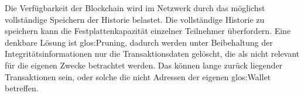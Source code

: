 Die Verfügbarkeit der Blockchain wird im Netzwerk durch das möglichst vollständige Speichern der Historie belastet.
Die vollständige Historie zu speichern kann die Festplattenkapazität einzelner Teilnehmer überfordern.
Eine denkbare Lösung ist \gls{glos:Pruning}, dadurch werden unter Beibehaltung der Integritätsinformationen nur die Transaktionsdaten gelöscht, die als nicht relevant für die eigenen Zwecke betrachtet werden. Das können \zB{} lange zurück liegender Transaktionen sein, oder solche die nicht Adressen der eigenen \gls{glos:Wallet} betreffen.

